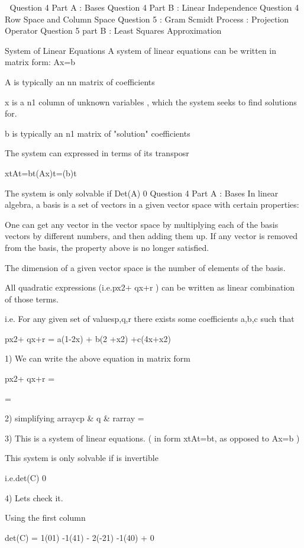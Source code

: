 

Question 4 Part A : Bases
Question 4 Part B : Linear Independence
Question 4 Row Space and Column Space
Question 5 : Gram Scmidt Process : Projection Operator
Question 5 part B : Least Squares Approximation
 
 
System of Linear Equations
A system of linear equations can be written in matrix form: Ax=b
 
A is typically an  nn matrix of coefficients
 
x is a n1 column of unknown variables , which the system seeks to find solutions for.
 
b is typically an  n1 matrix of "solution" coefficients
 
The system can expressed in terms of its transposr
 
xtAt=bt(Ax)t=(b)t
 
The system is only solvable if Det(A) 0
Question 4 Part A : Bases
In linear algebra, a basis is a set of vectors in a given vector space with certain properties:

 
One can get any vector in the vector space by multiplying each of the basis vectors by different numbers, and then adding them up. 
If any vector is removed from the basis, the property above is no longer satisfied. 
 

 
The dimension of a given vector space is the number of elements of the basis.
 
 
All quadratic expressions (i.e.px2+ qx+r ) can be written as linear combination of those terms.
 
i.e. For any given set of values{p,q,r} there exists some coefficients {a,b,c} such that
 
px2+ qx+r = a(1-2x) + b(2 +x2) +c(4x+x2)
 
 
1) We can write the above equation in matrix form
 
            
 
        px2+ qx+r = 
 
 
 = 
 
  
2) simplifying
arraycp & q & rarray = 
 
 
3) This is a system of linear equations. ( in form xtAt=bt, as opposed to Ax=b )  
 
 
This system is only solvable if  is invertible
 
i.e.det(C) 0
 
4) Lets check it.
 
Using the first column
  
det(C) = 1(01) -1(41) - 2(-21) -1(40) + 0
 
